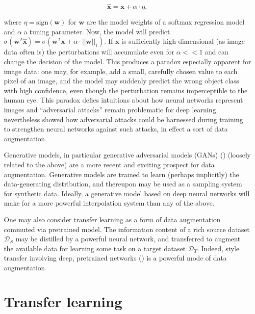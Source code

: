 \begin{equation}
\hat{\mathbf{x}} = \mathbf{x} + \alpha\cdot\eta,
\end{equation}

where $\eta = \text{sign}(\mathbf{w})$ for $\mathbf{w}$ are the model weights of a softmax regression model and $\alpha$ a tuning parameter. Now, the model will predict $\sigma(\mathbf{w}^T\hat{\mathbf{x}}) = \sigma(\mathbf{w}^T\mathbf{x} + \alpha\cdot||\mathbf{w}||_1)$. If $\mathbf{x}$ is sufficiently high-dimensional (as image data often is) the perturbations will accumulate even for $\alpha << 1$ and can change the decision of the model. This produces a paradox especially apparent for image data: one may, for example, add a small, carefully chosen value to each pixel of an image, and the model may suddenly predict the wrong object class with high confidence, even though the perturbation remains imperceptible to the human eye. This paradox defies intuitions about how neural networks represent images and ``adversarial attacks'' remain problematic for deep learning. \cite{goodfellow2014explaining} nevertheless showed how adversarial attacks could be harnessed during training to strengthen neural networks against such attacks, in effect a sort of data augmentation.

Generative models, in particular generative adversarial models (GANs) (\cite{goodfellow2014generative}) (loosely related to the above) are a more recent and exciting prospect for data augmentation. Generative models are trained to learn (perhaps implicitly) the data-generating distribution, and thereupon may be used as a sampling system for synthetic data. Ideally, a generative model based on deep neural networks will make for a more powerful interpolation system than any of the above.

One may also consider transfer learning as a form of data augmentation commuted via pretrained model. The information content of a rich source dataset $\mathcal{D}_S$ may be distilled by a powerful neural network, and transferred to augment the available data for learning some task on a target dataset $\mathcal{D}_T$. Indeed, style transfer involving deep, pretrained networks (\cite{gatys2016image}) is a powerful mode of data augmentation.

\section{Transfer learning}

